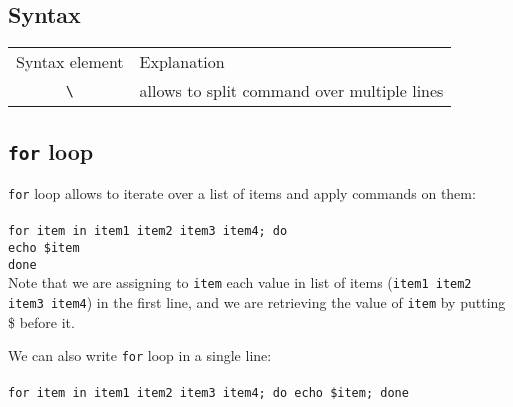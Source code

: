 \subsection{Syntax}
\begin{tabular}{cl}
  Syntax element & Explanation \\
  \hhline{==}
  \texttt{\textbackslash} & allows to split command over multiple lines\\
  
\end{tabular}
\subsection{\texttt{for} loop}
\texttt{for} loop allows to iterate over a list of items and apply commands on them:\\~\\
\texttt{for item in item1 item2 item3 item4; do\\
  \indent echo \$item \\
done}\\

Note that we are assigning to \texttt{item} each value in list of items 
(\texttt{item1 item2 item3 item4}) in the first line, and we are retrieving
the value of \texttt{item} by putting \$ before it.

We can also write \texttt{for} loop in a single line:\\~\\
\texttt{for item in item1 item2 item3 item4; do echo \$item; done}\\


